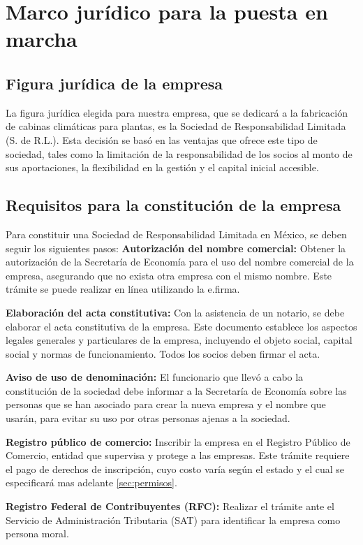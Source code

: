 \section{Marco jurídico para la puesta en marcha}


\subsection{Figura jurídica de la empresa}
La figura jurídica elegida para nuestra empresa, que se dedicará a la fabricación de cabinas climáticas para plantas, es la Sociedad de Responsabilidad Limitada (S. de R.L.). Esta decisión se basó en las ventajas que ofrece este tipo de sociedad, tales como la limitación de la responsabilidad de los socios al monto de sus aportaciones, la flexibilidad en la gestión y el capital inicial accesible.
\subsection{Requisitos para la constitución de la empresa}
Para constituir una Sociedad de Responsabilidad Limitada en México, se deben seguir los siguientes pasos:
\textbf{Autorización del nombre comercial:}
Obtener la autorización de la Secretaría de Economía para el uso del nombre comercial de la empresa, asegurando que no exista otra empresa con el mismo nombre. Este trámite se puede realizar en línea utilizando la e.firma.

\textbf{Elaboración del acta constitutiva:}
Con la asistencia de un notario, se debe elaborar el acta constitutiva de la empresa. Este documento establece los aspectos legales generales y particulares de la empresa, incluyendo el objeto social, capital social y normas de funcionamiento. Todos los socios deben firmar el acta.

\textbf{Aviso de uso de denominación:}
El funcionario que llevó a cabo la constitución de la sociedad debe informar a la Secretaría de Economía sobre las personas que se han asociado para crear la nueva empresa y el nombre que usarán, para evitar su uso por otras personas ajenas a la sociedad.

\textbf{Registro público de comercio:}
Inscribir la empresa en el Registro Público de Comercio, entidad que supervisa y protege a las empresas. Este trámite requiere el pago de derechos de inscripción, cuyo costo varía según el estado y el cual se especificará mas adelante \ref{sec:permisos}.

\textbf{Registro Federal de Contribuyentes (RFC):}
Realizar el trámite ante el Servicio de Administración Tributaria (SAT) para identificar la empresa como persona moral.

